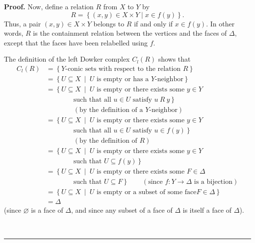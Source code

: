 \documentclass[numbers=enddot,12pt,final,onecolumn,notitlepage]{scrartcl}%
\theoremstyle{definition}
\newenvironment{proof}[1][Proof]{\noindent\textbf{#1.} }{\ \rule{0.5em}{0.5em}}
\newenvironment{vershort}{}{}
\begin{document}
\begin{proof}
Now, define a relation $R$ from $X$ to $Y$ by
\[
R=\left\{  \left(  x,y\right)  \in X\times Y\mid x\in f\left(  y\right)
\right\}  .
\]
Thus, a pair $\left(  x,y\right)  \in X\times Y$ belongs to $R$ if and only if
$x\in f\left(  y\right)  $. In other words, $R$ is the containment relation
between the vertices and the faces of $\Delta$, except that the faces have
been relabelled using $f$.

\begin{vershort}
The definition of the left Dowker complex $C_{l}\left(  R\right)  $ shows that%
\begin{align*}
C_{l}\left(  R\right)    & =\left\{  Y\text{-conic sets with respect to the
relation }R\right\}  \\
& =\left\{  U\subseteq X\ \mid\ U\text{ is empty or has a }Y\text{-neighbor}%
\right\}  \\
& =\left\{  U\subseteq X\ \mid\ U\text{ is empty or there exists some }y\in
Y\right.  \\
& \qquad\qquad\left.  \text{such that all }u\in U\text{ satisfy }%
u\ R\ y\right\}  \\
& \qquad\qquad\left(  \text{by the definition of a }Y\text{-neighbor}\right)
\\
& =\left\{  U\subseteq X\ \mid\ U\text{ is empty or there exists some }y\in
Y\right.  \\
& \qquad\qquad\left.  \text{such that all }u\in U\text{ satisfy }u\in f\left(
y\right)  \right\}  \\
& \qquad\qquad\left(  \text{by the definition of }R\right)  \\
& =\left\{  U\subseteq X\ \mid\ U\text{ is empty or there exists some }y\in
Y\right.  \\
& \qquad\qquad\left.  \text{such that }U\subseteq f\left(  y\right)  \right\}
\\
& =\left\{  U\subseteq X\ \mid\ U\text{ is empty or there exists some }%
F\in\Delta\right.  \\
& \qquad\qquad\left.  \text{such that }U\subseteq F\right\}  \qquad\left(
\text{since }f:Y\rightarrow\Delta\text{ is a bijection}\right)  \\
& =\left\{  U\subseteq X\ \mid\ U\text{ is empty or a subset of some face
}F\in\Delta\right\}  \\
& =\Delta
\end{align*}
(since $\varnothing$ is a face of $\Delta$, and since any subset of a face of
$\Delta$ is itself a face of $\Delta$).
\end{vershort}


\end{proof}
\end{document}

